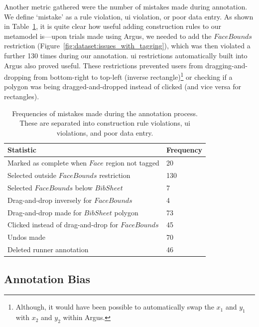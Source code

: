 Another metric gathered were the number of mistakes made during annotation. We define `mistake' as a rule violation, \gls{ui} violation, or poor data entry. As shown in Table~\ref{tab:dataset:argus:metrics:mistakes}, it is quite clear how useful adding construction rules to our metamodel is---upon trials made using Argus, we needed to add the $FaceBounds$ restriction (Figure~\ref{fig:dataset:issues_with_tagging}), which was then violated a further 130 times during our annotation. \gls{ui} restrictions automatically built into Argus also proved useful. These restrictions  prevented users from dragging-and-dropping from bottom-right to top-left (inverse rectangle)\footnote{Although, it would have been possible to automatically swap the $x_{1}$ and $y_{1}$ with $x_{2}$ and $y_{2}$ within Argus.} or checking if a polygon was being dragged-and-dropped instead of clicked (and vice versa for rectangles).

\begin{table}[h]
  \centering
  \caption[Mistakes using Argus]{Frequencies of mistakes made during the annotation process. These are separated into construction rule violations, \gls{ui} violations, and poor data entry.}
  \label{tab:dataset:argus:metrics:mistakes}
  \begin{tabular}{@{}ll@{}}
    \toprule
    \textbf{Statistic}                                & \textbf{Frequency} \\ \midrule
    Marked as complete when $Face$ region not tagged  & 20                 \\
    Selected outside $FaceBounds$ restriction         & 130                \\
    Selected $FaceBounds$ below $BibSheet$            & 7                  \\
    \midrule
    Drag-and-drop inversely for $FaceBounds$          & 4                  \\
    Drag-and-drop made for $BibSheet$ polygon         & 73                 \\
    Clicked instead of drag-and-drop for $FaceBounds$ & 45                 \\
    \midrule
    Undos made                                        & 70                 \\
    Deleted runner annotation                         & 46                 \\ \bottomrule
  \end{tabular}
\end{table}

\subsection{Annotation  Bias}


